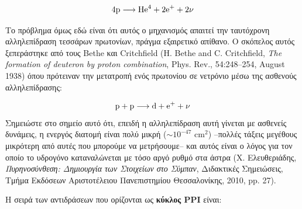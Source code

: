 \begin{eqnarray}
\rm 4p \longrightarrow \rm He^4 + 2e^{+} +2 \nu \label{eq:4p_he4}
\end{eqnarray}

Το πρόβλημα όμως εδώ είναι ότι αυτός ο μηχανισμός απαιτεί την ταυτόχρονη αλληλεπίδραση τεσσάρων πρωτονίων, πράγμα εξαιρετικό απίθανο. Ο σκόπελος αυτός ξεπεράστηκε από τους Bethe και Critchfield (H. Bethe and C. Critchfield, \textit{The formation of deuteron by proton combination}, Phys. Rev., 54:248–254, August 1938) όπου πρότειναν την μετατροπή ενός πρωτονίου σε νετρόνιο μέσω της ασθενούς αλληλεπίδρασης:

\begin{eqnarray}
\rm p + p \longrightarrow \rm d + e^{+} + \nu \label{eq:p+p_d+e}
\end{eqnarray}
Σημειώστε στο σημείο αυτό ότι, επειδή η αλληλεπίδραση αυτή γίνεται με ασθενείς δυνάμεις, η ενεργός διατομή είναι πολύ μικρή ($\sim 10^{-47}$ cm$^2$) --πολλές τάξεις μεγέθους μικρότερη από αυτές που μπορούμε να μετρήσουμε-- και αυτός είναι ο λόγος για τον οποίο το υδρογόνο καταναλώνεται με τόσο αργό ρυθμό στα άστρα (Χ. Ελευθεριάδης, \textit{Πυρηνοσύνθεση: Δημιουργία των Στοιχείων στο Σύμπαν}, Διδακτικές Σημειώσεις, Τμήμα Εκδόσεων Αριστοτέλειου Πανεπιστημίου Θεσσαλονίκης, 2010, pp. 27).

Η σειρά των αντιδράσεων που ορίζονται ως \textbf{κύκλος PPI} είναι:

